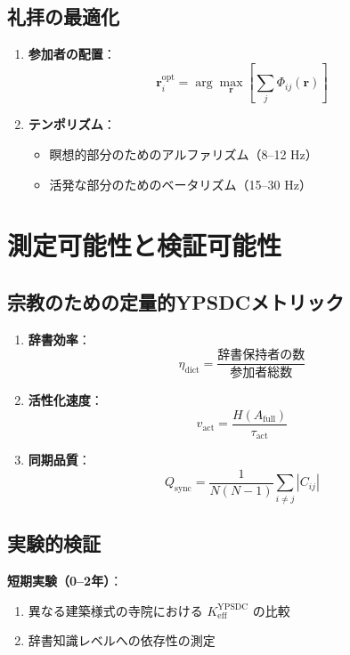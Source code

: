 \documentclass[12pt,a4paper]{article}
\begin{document}
	\subsection{礼拝の最適化}
	
	\begin{enumerate}
		\item \textbf{参加者の配置}：
		\[
		\mathbf{r}_i^{\mathrm{opt}} = \arg\max_{\mathbf{r}} \left[\sum_j \Phi_{ij}(\mathbf{r})\right]
		\]
		\item \textbf{テンポリズム}：
		\begin{itemize}
			\item 瞑想的部分のためのアルファリズム（8–12 Hz）
			\item 活発な部分のためのベータリズム（15–30 Hz）
		\end{itemize}
	\end{enumerate}
	
	\section{測定可能性と検証可能性}
	
	\subsection{宗教のための定量的YPSDCメトリック}
	
	\begin{enumerate}
		\item \textbf{辞書効率}：
		\[
		\eta_{\mathrm{dict}} = \frac{\text{辞書保持者の数}}{\text{参加者総数}}
		\]
		\item \textbf{活性化速度}：
		\[
		v_{\mathrm{act}} = \frac{H(A_{\mathrm{full}})}{\tau_{\mathrm{act}}}
		\]
		\item \textbf{同期品質}：
		\[
		Q_{\mathrm{sync}} = \frac{1}{N(N-1)} \sum_{i \neq j} |C_{ij}|
		\]
	\end{enumerate}
	
	\subsection{実験的検証}
	
	\textbf{短期実験（0–2年）}：
	\begin{enumerate}
		\item 異なる建築様式の寺院における $K_{\mathrm{eff}}^{\mathrm{YPSDC}}$ の比較
		\item 辞書知識レベルへの依存性の測定
	\end{enumerate}
	
\end{document}
